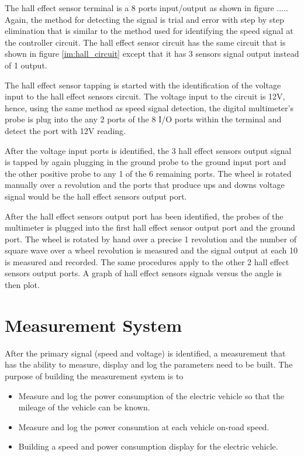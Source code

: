 The hall effect sensor terminal is a 8 ports input/output as shown in figure ..... Again, the method for detecting the signal is trial and error with step by step elimination that is similar to the method used for identifying the speed signal at the controller circuit. The hall effect sensor circuit has the same circuit that is shown in figure \ref{im:hall_circuit} except that it has 3 sensors signal output instead of 1 output. 

The hall effect sensor tapping is started with the identification of the voltage input to the hall effect sensors circuit. The voltage input to the circuit is 12V, hence, using the same method as speed signal detection, the digital multimeter's probe is plug into the any 2 ports of the 8 I/O ports within the terminal and detect the port with 12V reading.

After the voltage input ports is identified, the 3 hall effect sensors output signal is tapped by again plugging in the ground probe to the ground input port and the other positive probe to any 1 of the 6 remaining ports. The wheel is rotated manually over a revolution and the ports that produce ups and downs voltage signal would be the hall effect sensors output port.

After the hall effect sensors output port has been identified, the probes of the multimeter is plugged into the first hall effect sensor output port and the ground port. The wheel is rotated by hand over a precise 1 revolution and the number of square wave over a wheel revolution is measured and the signal output at each 10 \textdegree is measured and recorded. The same procedures apply to the other 2 hall effect sensors output ports. A graph of hall effect sensors signals versus the angle is then plot.

\section{Measurement System}
After the primary signal (speed and voltage) is identified, a measurement that has the ability to measure, display and log the parameters need to be built. The purpose of building the measurement system is to

\begin{itemize}
	\item{Measure and log the power consumption of the electric vehicle so that the mileage of the vehicle can be known.}
	\item{Measure and log the power consumtion at each vehicle on-road speed.}
	\item{Building a speed and power consumption display for the electric vehicle.}
\end{itemize}

